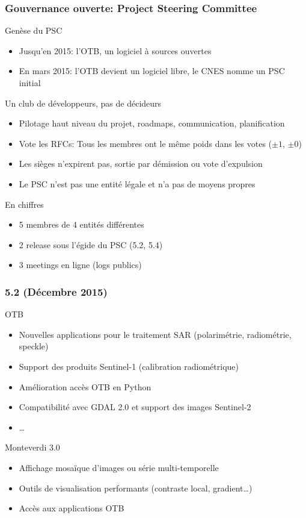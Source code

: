 \documentclass[8pt]{beamer}
\begin{document}
\begin{frame}
\frametitle{Gouvernance ouverte: Project Steering Committee}
\begin{block}{Genèse du PSC}
  \begin{itemize}
  \item Jusqu'en 2015: l'OTB, un logiciel à sources ouvertes
  \item En mars 2015: l'OTB devient un logiciel libre, le CNES nomme un PSC initial
  \end{itemize}
\end{block}
\begin{block}{Un club de développeurs, pas de décideurs}
  \begin{itemize}
  \item Pilotage haut niveau du projet, roadmaps, communication, planification
  \item Vote les RFCs: Tous les membres ont le même poids dans les votes ($\pm 1$, $\pm 0$)
  \item Les sièges n'expirent pas, sortie par démission ou vote d'expulsion
  \item Le PSC n'est pas une entité légale et n'a pas de moyens propres
  \end{itemize}
\end{block}
\begin{block}{En chiffres}
  \begin{itemize}
  \item 5 membres de 4 entités différentes
  \item 2 release sous l'égide du PSC (5.2, 5.4)
  \item 3 meetings en ligne (logs publics)
  \end{itemize}
\end{block}
\end{frame}

\begin{frame}
\frametitle{5.2 (Décembre 2015)}
\begin{block}{OTB}
\begin{itemize}
\item Nouvelles applications pour le traitement SAR (polarimétrie, radiométrie, speckle)
\item Support des produits Sentinel-1 (calibration radiométrique)
\item Amélioration accès OTB en Python
\item Compatibilité avec GDAL 2.0 et support des images Sentinel-2
\item \ldots
\end{itemize}
\end{block}

\begin{block}{Monteverdi 3.0}
\begin{itemize}
\item Affichage mosaïque d'images ou série multi-temporelle
\item Outils de visualisation performants (contraste local, gradient\ldots)
\item Accès aux applications OTB
\end{itemize}
\end{block}
\end{frame}
\end{document}
